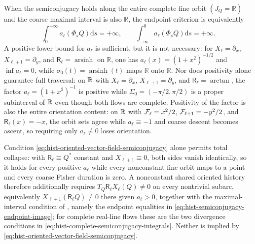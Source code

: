 When the semiconjugacy holds along the entire complete fine orbit
\((J_Q=\mathbb R)\) and the coarse maximal interval is also \(\mathbb R\), the
endpoint criterion is equivalently
\begin{equation}
\int_0^{+\infty}a_\ell(\Phi_sQ)\mathrm{d}s=+\infty,
\qquad
\int_{-\infty}^{0}a_\ell(\Phi_sQ)\mathrm{d}s=+\infty.
\label{eq:hist-complete-semiconjugacy-integrals}
\end{equation}
A positive lower bound for $a_\ell$ is sufficient, but it is not necessary:
for $X_\ell=\partial_x$, $X_{\ell+1}=\partial_y$, and
$\mathsf R_\ell=\operatorname{arsinh}$ on $\mathbb R$, one has
$a_\ell(x)=(1+x^2)^{-1/2}$ and $\inf a_\ell=0$, while
$\sigma_0(t)=\operatorname{arsinh}(t)$ maps $\mathbb R$ onto $\mathbb R$.
Nor does positivity alone guarantee full traversal: on $\mathbb R$ with
$X_\ell=\partial_x$, $X_{\ell+1}=\partial_y$, and
$\mathsf R_\ell=\arctan$, the factor $a_\ell=(1+x^2)^{-1}$ is positive while
$\Sigma_0=(-\pi/2,\pi/2)$ is a proper subinterval of $\mathbb R$ even though both
flows are complete.  Positivity of the factor is also the entire orientation
content: on $\mathbb R$ with $\mathcal F_\ell=x^2/2$, $\mathcal F_{\ell+1}=-y^2/2$, and
$\mathsf R_\ell(x)=-x$, the orbit sets agree while $a_\ell\equiv-1$ and coarse
descent becomes ascent, so requiring only $a_\ell\ne0$ loses orientation.

Condition \eqref{eq:hist-oriented-vector-field-semiconjugacy} alone permits
total collapse: with $\mathsf R_\ell\equiv Q^\ast$ constant and
$X_{\ell+1}\equiv0$, both sides vanish identically, so it holds for every
positive $a_\ell$ while every nonconstant fine orbit maps to a point and every
coarse Fisher duration is zero.  A nonconstant shared oriented history
therefore additionally requires $T_Q\mathsf R_\ell X_\ell(Q)\ne0$ on every
nontrivial subarc, equivalently $X_{\ell+1}(\mathsf R_\ell Q)\ne0$ there given
$a_\ell>0$, together with the maximal-interval condition of
, namely the endpoint equalities in
\eqref{eq:hist-semiconjugacy-endpoint-image}; for complete real-line flows
these are the two divergence conditions in
\eqref{eq:hist-complete-semiconjugacy-integrals}.  Neither is implied by
\eqref{eq:hist-oriented-vector-field-semiconjugacy}.  

